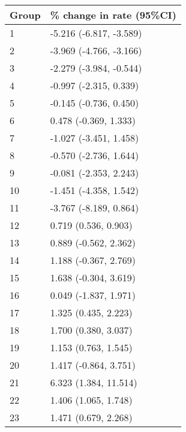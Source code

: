 \begin{tabular}{ll}
  \hline
Group & \% change in rate (95\%CI) \\ 
  \hline
   1 & -5.216 (-6.817, -3.589) \\ 
     2 & -3.969 (-4.766, -3.166) \\ 
     3 & -2.279 (-3.984, -0.544) \\ 
     4 & -0.997 (-2.315, 0.339) \\ 
     5 & -0.145 (-0.736, 0.450) \\ 
     6 & 0.478 (-0.369, 1.333) \\ 
     7 & -1.027 (-3.451, 1.458) \\ 
     8 & -0.570 (-2.736, 1.644) \\ 
     9 & -0.081 (-2.353, 2.243) \\ 
    10 & -1.451 (-4.358, 1.542) \\ 
    11 & -3.767 (-8.189, 0.864) \\ 
    12 & 0.719 (0.536, 0.903) \\ 
    13 & 0.889 (-0.562, 2.362) \\ 
    14 & 1.188 (-0.367, 2.769) \\ 
    15 & 1.638 (-0.304, 3.619) \\ 
    16 & 0.049 (-1.837, 1.971) \\ 
    17 & 1.325 (0.435, 2.223) \\ 
    18 & 1.700 (0.380, 3.037) \\ 
    19 & 1.153 (0.763, 1.545) \\ 
    20 & 1.417 (-0.864, 3.751) \\ 
    21 & 6.323 (1.384, 11.514) \\ 
    22 & 1.406 (1.065, 1.748) \\ 
    23 & 1.471 (0.679, 2.268) \\ 
   \hline
\end{tabular}

